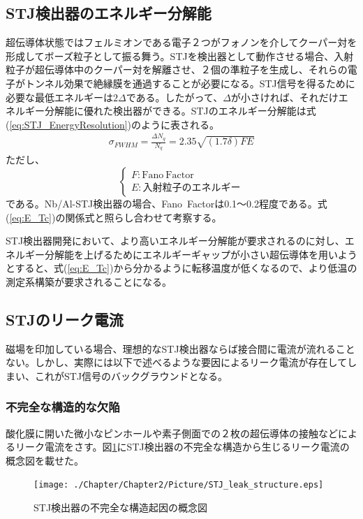 	\subsection{STJ検出器のエネルギー分解能}
		超伝導体状態ではフェルミオンである電子２つがフォノンを介してクーパー対を形成してボーズ粒子として振る舞う。STJを検出器として動作させる場合、入射粒子が超伝導体中のクーパー対を解離させ、２個の準粒子を生成し、それらの電子がトンネル効果で絶縁膜を通過することが必要になる。STJ信号を得るために必要な最低エネルギーは$2\Delta$である。したがって、$\Delta$が小さければ、それだけエネルギー分解能に優れた検出器ができる。STJのエネルギー分解能は式(\ref{eq:STJ_EnergyResolution})のように表される。
		\begin{eqnarray}
			\sigma_{FWHM} = \frac{\Delta N_q}{N_q} = 2.35 \sqrt{(1.7 \delta) FE}
			\label{eq:STJ_EnergyResolution}
		\end{eqnarray}
		ただし、
		\[
		\begin{cases}
			F : \mathrm{Fano\ Factor} \\
			E : \mathrm{入射粒子のエネルギー}
		\end{cases}
		\]
		である。Nb/Al-STJ検出器の場合、Fano\ Factorは0.1〜0.2程度である。式(\ref{eq:E_Tc})の関係式と照らし合わせて考察する。
		
		STJ検出器開発において、より高いエネルギー分解能が要求されるのに対し、エネルギー分解能を上げるためにエネルギーギャップが小さい超伝導体を用いようとすると、式(\ref{eq:E_Tc})から分かるように転移温度が低くなるので、より低温の測定系構築が要求されることになる。
		
	\subsection{STJのリーク電流}
		磁場を印加している場合、理想的なSTJ検出器ならば接合間に電流が流れることない。しかし、実際には以下で述べるような要因によるリーク電流が存在してしまい、これがSTJ信号のバックグラウンドとなる。
		\subsubsection{不完全な構造的な欠陥}
			酸化膜に開いた微小なピンホールや素子側面での２枚の超伝導体の接触などによるリーク電流をさす。図\ref{fig:STJ_leak_structure}にSTJ検出器の不完全な構造から生じるリーク電流の概念図を載せた。
			\begin{figure}[htbp]
  				\begin{center}
    					\texttt{[image: ./Chapter/Chapter2/Picture/STJ\_leak\_structure.eps]}
    					\caption{STJ検出器の不完全な構造起因の概念図}
    					\label{fig:STJ_leak_structure}
  				\end{center}
			\end{figure}	
		
